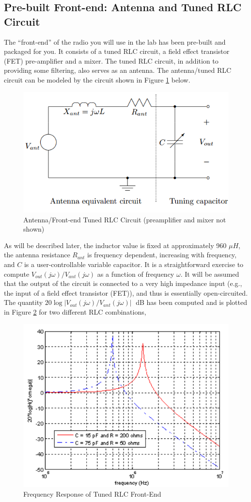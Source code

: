 \documentclass{article}
\begin{document}
\subsection{Pre-built Front-end: Antenna and Tuned RLC Circuit}
The “front-end” of the radio you will use in the lab has been pre-built and packaged for you. It consists of a tuned RLC circuit, a field effect transistor (FET) pre-amplifier and a mixer. The tuned RLC circuit, in addition to providing some filtering, also serves as an antenna. The antenna/tuned RLC circuit can be modeled by the circuit shown in Figure \ref{prebuilt} below.\\
\begin{figure}[htbp]
	\centering
	\includegraphics[width=0.7\linewidth]{fig2.png}
	\caption{Antenna/Front-end Tuned RLC Circuit (preamplifier and mixer not shown)}
	\label{prebuilt}
\end{figure}
As will be described later, the inductor value is fixed at approximately 960 $\mu H$, the antenna resistance $R_{ant}$ is frequency dependent, increasing with frequency, and $C$ is a user-controllable variable capacitor. It is a straightforward exercise to compute $V_{out}(j\omega)/V_{ant}(j\omega)$ as a function of frequency $\omega$. It will be assumed that the output of the circuit is connected to a very high impedance input (e.g., the input of a field effect transistor (FET)), and thus is essentially open-circuited. The quantity $20\log|V_{out}(j\omega)/V_{ant}(j\omega)|$  dB has been computed and is plotted in Figure \ref{frontend} for two different RLC combinations, 
\begin{figure}[htbp]
	\centering
	\includegraphics[width=0.7\linewidth]{fig3.png}
	\caption{Frequency Response of Tuned RLC Front-End}
	\label{frontend}
\end{figure}
\end{document}
